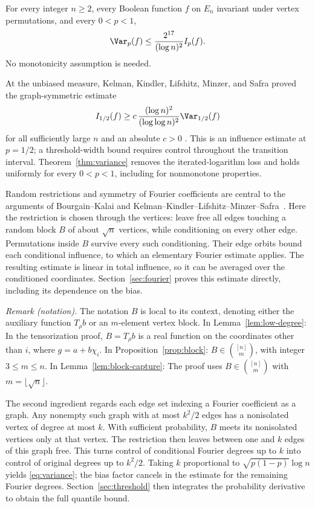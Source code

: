\begin{theorem}
\label{thm:variance}
For every integer $n\ge2$, every Boolean function $f$ on $E_n$ invariant under vertex permutations, and every $0<p<1$,
\begin{equation}
\label{eq:variance}
 \Var_p(f)\le\frac{2^{17}}{(\log n)^2}I_p(f).
\end{equation}
No monotonicity assumption is needed.
\end{theorem}

At the unbiased measure, Kelman, Kindler, Lifshitz, Minzer, and Safra
proved the graph-symmetric estimate
\[
 I_{1/2}(f)\ge
 c\,\frac{(\log n)^2}{(\log\log n)^2}\Var_{1/2}(f)
\]
for all sufficiently large $n$ and an absolute $c>0$
\cite[arXiv version~2, Section~7.4]{KKLMS20}.
This is an influence estimate at $p=1/2$; a threshold-width bound
requires control throughout the transition interval.
Theorem~\ref{thm:variance} removes the iterated-logarithm loss and
holds uniformly for every $0<p<1$, including for nonmonotone properties.

Random restrictions and symmetry of Fourier coefficients are central
to the arguments of Bourgain--Kalai and
Kelman--Kindler--Lifshitz--Minzer--Safra~\cite{BK97,KKLMS20}.
Here the restriction is chosen through the vertices: leave free all
edges touching a random block $B$ of about $\sqrt n$ vertices, while
conditioning on every other edge. Permutations inside $B$ survive
every such conditioning. Their edge orbits bound each conditional
influence, to which an elementary Fourier estimate applies.
The resulting estimate is linear in total influence, so it can be
averaged over the conditioned coordinates. Section~\ref{sec:fourier}
proves this estimate directly, including its dependence on the bias.

\noindent\textit{Remark (notation).} The notation $B$ is local to its context, denoting either the auxiliary function $T_\rho b$ or an $m$-element vertex block. In Lemma~\ref{lem:low-degree}: In the tensorization proof, $B=T_\rho b$ is a real function on the coordinates other than $i$, where $g=a+b\chi_i$. In Proposition~\ref{prop:block}: $B\in\binom{[n]}m$, with integer $3\le m\le n$. In Lemma~\ref{lem:block-capture}: The proof uses $B\in\binom{[n]}m$ with $m=\lfloor\sqrt n\rfloor$.


The second ingredient regards each edge set indexing a Fourier
coefficient as a graph. Any nonempty such graph with at most $k^2/2$
edges has a nonisolated vertex of degree at most $k$. With sufficient
probability, $B$ meets its nonisolated vertices only at that vertex.
The restriction then leaves between one and $k$ edges of this graph
free. This turns control of conditional Fourier degrees up to $k$
into control of original degrees up to $k^2/2$. Taking $k$ proportional
to $\sqrt{p(1-p)}\log n$ yields \eqref{eq:variance}; the bias factor
cancels in the estimate for the remaining Fourier degrees.
Section~\ref{sec:threshold} then integrates the probability derivative
to obtain the full quantile bound.

